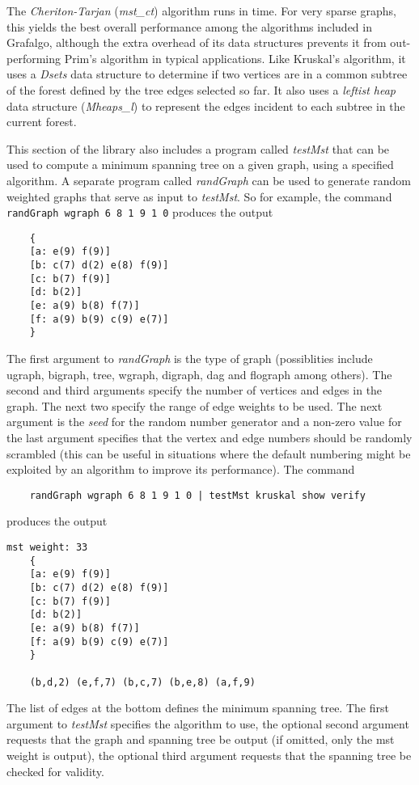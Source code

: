 \documentclass[11pt]{article}
\begin{document}
The {\sl Cheriton-Tarjan} ({\sl mst\_ct}) algorithm runs in  time. For very sparse graphs,
this yields the best overall performance among the algorithms included in Grafalgo, 
although the extra overhead of its data structures
prevents it from out-performing Prim's algorithm in typical applications. Like Kruskal's algorithm,
it uses a {\sl Dsets} data structure to determine if two vertices are in a common subtree of the
forest defined by the tree edges selected so far. It also uses a {\sl leftist heap} data structure ({\sl Mheaps\_l})
to represent the edges incident to each subtree in the current forest.

This section of the library also includes a program called {\sl testMst} that can be used to
compute a minimum spanning tree on a given graph, using a specified algorithm.
A separate program called {\sl randGraph} can be used
to generate random weighted graphs that serve as input to {\sl testMst}. 
So for example, the command
{\tt randGraph wgraph 6 8 1 9 1 0} produces the output
\begin{verbatim}
    {
    [a: e(9) f(9)]
    [b: c(7) d(2) e(8) f(9)]
    [c: b(7) f(9)]
    [d: b(2)]
    [e: a(9) b(8) f(7)]
    [f: a(9) b(9) c(9) e(7)]
    }
\end{verbatim}
The first argument to {\sl randGraph} is the type of graph
(possiblities include ugraph, bigraph, tree, wgraph, digraph, dag and flograph among others).
The second and third arguments specify the number of vertices and edges in the graph.
The next two specify the range of edge weights to be used.
The next argument is the {\sl seed} for the random number generator and a
non-zero value for the last argument specifies that the vertex and edge numbers should be 
randomly scrambled (this can be useful in situations where the default
numbering might be exploited by an algorithm to improve its performance).
The command
\begin{verbatim}
    randGraph wgraph 6 8 1 9 1 0 | testMst kruskal show verify 
\end{verbatim}
produces the output
\newpage
\begin{verbatim}
mst weight: 33
    {
    [a: e(9) f(9)]
    [b: c(7) d(2) e(8) f(9)]
    [c: b(7) f(9)]
    [d: b(2)]
    [e: a(9) b(8) f(7)]
    [f: a(9) b(9) c(9) e(7)]
    }

    (b,d,2) (e,f,7) (b,c,7) (b,e,8) (a,f,9)
\end{verbatim}
The list of edges at the bottom defines the minimum spanning tree.
The first argument to {\sl testMst} specifies the algorithm to use,
the optional second argument requests that the graph and spanning tree be output
(if omitted, only the mst weight is output), the optional third argument requests that
the spanning tree be checked for validity.
\end{document}
